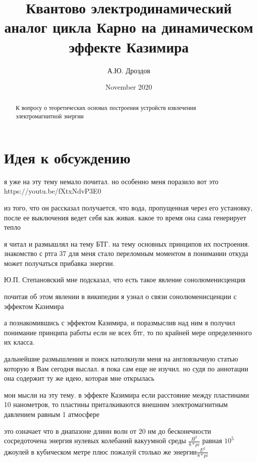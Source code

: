 \documentclass[12pt, letterpaper]{article}
\begin{document}
\title{Квантово электродинамический аналог цикла Карно на динамическом эффекте Казимира}
\author{А.Ю. Дроздов}
\date{November 2020}

\begin{titlepage}
\maketitle
\end{titlepage}


\begin{abstract}
К вопросу о теоретических основах построения устройств извлечения электромагнитной энергии
\end{abstract}



\section{Идея к обсуждению}

я уже на эту тему немало почитал. но особенно меня поразило вот это
https://youtu.be/fXtxNdvP3E0

из того, что он рассказал получается, что вода, пропущенная через его установку, после ее выключения ведет себя как живая. какое то время она сама генерирует тепло

я читал и размышлял на тему БТГ. на тему основных принципов их построения. знакомство с ртга 37 для меня стало переломным моментом в понимании откуда может получаться прибавка энергии. 

Ю.П. Степановский мне подсказал, что есть такое явление сонолюменисценция

почитав об этом явлении в википедии я узнал о связи сонолюменисценции с эффектом Казимира

а познакомившись с эффектом Казимира, и поразмыслив над ним я получил понимание принципа работы если не всех бтг, то по крайней мере определенного их класса.

дальнейшие размышления и поиск натолкнули меня на англоязычную статью \cite{Chan2001} которую я Вам сегодня выслал. я пока сам еще не изучил. но судя по аннотации она содержит ту же идею, которая мне открылась

мои мысли на эту тему. в эффекте Казимира если расстояние между пластинами 10 нанометров, то пластины приталкиваются внешним электромагнитным давлением равным 1 атмосфере

это означает что в диапазоне длинн волн от $20$ нм до бесконечности сосредоточена энергия нулевых колебаний вакуумной среды $\frac{H^2}{8*pi}$ равная $10^5$ джоулей в кубическом метре плюс пожалуй столько же энергии$\frac{E^2}{8*pi}$
\end{document}
